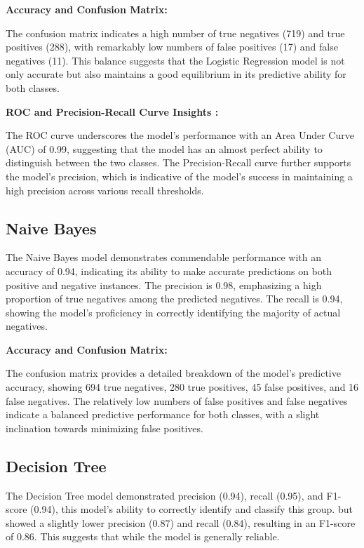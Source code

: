 \documentclass[conference]{IEEEtran}
\begin{document}
\textbf{Accuracy and Confusion Matrix:}

The confusion matrix indicates a high number of true negatives (719) and true positives (288), with remarkably low numbers of false positives (17) and false negatives (11). This balance suggests that the Logistic Regression model is not only accurate but also maintains a good equilibrium in its predictive ability for both classes.

\textbf{ROC and Precision-Recall Curve Insights :}

The ROC curve underscores the model's performance with an Area Under Curve (AUC) of 0.99, suggesting that the model has an almost perfect ability to distinguish between the two classes. The Precision-Recall curve further supports the model’s precision, which is indicative of the model's success in maintaining a high precision across various recall thresholds.

\subsection{\textbf{Naive Bayes}}

The Naive Bayes model demonstrates commendable performance with an accuracy of 0.94, indicating its ability to make accurate predictions on both positive and negative instances. The precision is 0.98, emphasizing a high proportion of true negatives among the predicted negatives. The recall is 0.94, showing the model's proficiency in correctly identifying the majority of actual negatives.

\textbf{Accuracy and Confusion Matrix:}

The confusion matrix provides a detailed breakdown of the model's predictive accuracy, showing 694 true negatives, 280 true positives, 45 false positives, and 16 false negatives. The relatively low numbers of false positives and false negatives indicate a balanced predictive performance for both classes, with a slight inclination towards minimizing false positives.

\subsection{\textbf{Decision Tree}}

The Decision Tree model demonstrated precision (0.94), recall (0.95), and F1-score (0.94), this model's ability to correctly identify and classify this group.  but showed a slightly lower precision (0.87) and recall (0.84), resulting in an F1-score of 0.86. This suggests that while the model is generally reliable.
\hfill
\end{document}
